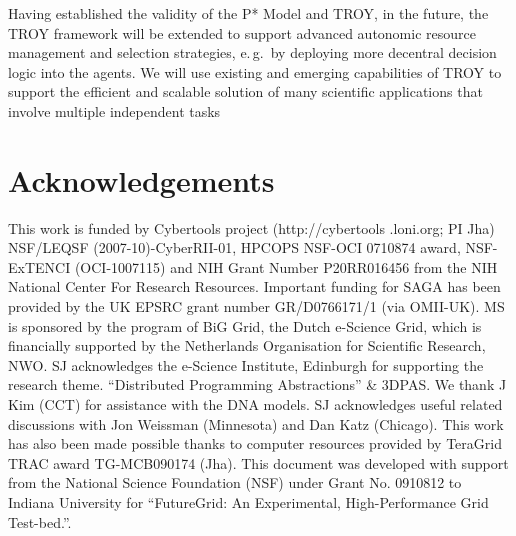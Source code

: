 \documentclass[conference,final]{IEEEtran}
\newcommand{\note}[1]{ {\textcolor{magenta} { ***Note: #1 }}}
\newcommand{\note}[1]{}
\newcommand{\up}{\vspace*{-1em}}
\newcommand{\upp}{\vspace*{-0.5em}}
\begin{document}

Having established the validity of the P* Model and TROY, in the
future, the TROY framework will be extended to support advanced
autonomic resource management and selection strategies, e.\,g.\ by
deploying more decentral decision logic into the agents. We will use
existing and emerging capabilities of TROY to support the efficient
and scalable solution of many scientific applications that involve
multiple independent tasks




\up
\section*{Acknowledgements\upp\upp}
\footnotesize{This work is funded by Cybertools project
  (http://cybertools .loni.org; PI Jha) NSF/LEQSF
  (2007-10)-CyberRII-01, HPCOPS NSF-OCI 0710874 award, NSF-ExTENCI
  (OCI-1007115) and NIH Grant Number P20RR016456 from the NIH National
  Center For Research Resources. Important funding for SAGA has been
  provided by the UK EPSRC grant number GR/D0766171/1 (via OMII-UK).
  MS is sponsored by the program of BiG Grid, the Dutch e-Science
  Grid, which is financially supported by the Netherlands Organisation
  for Scientific Research, NWO. SJ acknowledges the e-Science
  Institute, Edinburgh for supporting the research
  theme. ``Distributed Programming Abstractions'' \& 3DPAS. We thank J
  Kim (CCT) for assistance with the DNA models.  SJ acknowledges
  useful related discussions with Jon Weissman (Minnesota) and Dan
  Katz (Chicago). This work has also been made possible thanks to
  computer resources provided by TeraGrid TRAC award TG-MCB090174
  (Jha). This document was developed with support from the National
  Science Foundation (NSF) under Grant No.  0910812 to Indiana
  University for ``FutureGrid: An Experimental, High-Performance Grid
  Test-bed.''.}

\up


\end{document}
